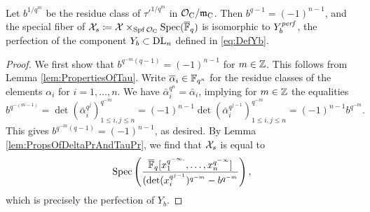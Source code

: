 \documentclass[../main.tex]{subfiles}
\begin{document}

\begin{prop}\label{prop:SpecialFiberOfAffinoidIsLusztig}
  Let $b^{1/q^m}$ be the residue class of $\tau'^{1/q^m}$ in $\mathcal{O}_{\mathrm{C}}/\mathfrak{m}_{{\mathrm{C}}}$. 
  Then $b^{q-1} = (-1)^{n-1}$, and the special fiber of $\mathcal{X}_s \coloneq \mathcal{X}
  \times_{\operatorname{Spf} \mathcal{O}_{\mathrm{C}}} \operatorname{Spec} ({\overline {\mathbb{F}}_q})$ is isomorphic to $Y_b^{\mathit{perf}}$, the
  perfection of the component $Y_b \subset \mathrm{DL}_n$ defined in \eqref{eq:DefYb}.
\begin{proof}
  We first show that $b^{q^{-m}(q-1)} = (-1)^{n-1}$ for $m \in \mathbb{Z}$. 
  This follows from Lemma \ref{lem:PropertiesOfTau}. 
  Write $\overline \alpha_i \in \mathbb{F}_{q^n}$ for the residue classes of the 
  elements $\alpha_i$ for $i = 1, \dots, n$. We have $\bar \alpha_i^{q^n}
  = \bar \alpha_i$, implying for $m \in \mathbb{Z}$ the equalities
  \begin{equation*}
    b^{q^{-(m-1)}} = \det(\bar \alpha_i^{q^j})_{1 \leq i,j \leq n}^{q^{-m}} =
    (-1)^{n-1} \det (\bar \alpha_i^{q^{j-1}})_{1 \leq i,j \leq n}^{q^{-m}} =
    (-1)^{n-1} b^{q^{-m}}.
  \end{equation*}
  This gives $b^{q^{-m}(q-1)} = (-1)^{n-1}$, as desired.
  By Lemma \ref{lem:PropsOfDeltaPrAndTauPr}, we find that $\mathcal{X}_s$ is equal to
  \begin{equation*}
    \operatorname{Spec} \left( \frac{{\overline {\mathbb{F}}_q} [x_1^{q^{-\infty,}}, \dots,
    x_n^{q^{-\infty}}]}{(\det(x_i^{q^{j-1}})^{q^{-m}}- b^{q^{-m}}} \right),
  \end{equation*}
  which is precisely the perfection of $Y_b$.
\end{proof}
\end{prop}
\end{document}
